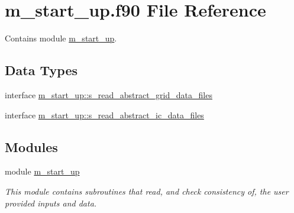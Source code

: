 \hypertarget{m__start__up_8f90}{}\section{m\+\_\+start\+\_\+up.\+f90 File Reference}
\label{m__start__up_8f90}


Contains module \hyperlink{namespacem__start__up}{m\+\_\+start\+\_\+up}.  


\subsection*{Data Types}
\begin{DoxyCompactItemize}
\item 
interface \hyperlink{interfacem__start__up_1_1s__read__abstract__grid__data__files}{m\+\_\+start\+\_\+up\+::s\+\_\+read\+\_\+abstract\+\_\+grid\+\_\+data\+\_\+files}
\item 
interface \hyperlink{interfacem__start__up_1_1s__read__abstract__ic__data__files}{m\+\_\+start\+\_\+up\+::s\+\_\+read\+\_\+abstract\+\_\+ic\+\_\+data\+\_\+files}
\end{DoxyCompactItemize}
\subsection*{Modules}
\begin{DoxyCompactItemize}
\item 
module \hyperlink{namespacem__start__up}{m\+\_\+start\+\_\+up}
\begin{DoxyCompactList}\small\item\em This module contains subroutines that read, and check consistency of, the user provided inputs and data. \end{DoxyCompactList}\end{DoxyCompactItemize}
